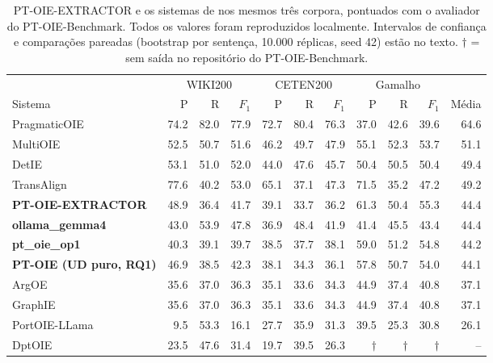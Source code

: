 \begin{table}[t]
\centering
\small
\setlength{\tabcolsep}{4pt}
\caption{PT-OIE-EXTRACTOR e os sistemas de \citet{silva2026benchmarking} nos mesmos tr\^es corpora, pontuados com o avaliador do PT-OIE-Benchmark. Todos os valores foram reproduzidos localmente. Intervalos de confian\c{c}a e compara\c{c}\~oes pareadas (bootstrap por senten\c{c}a, 10.000 r\'eplicas, seed 42) est\~ao no texto. $\dagger$ = sem sa\'ida no reposit\'orio do PT-OIE-Benchmark.}
\label{tab:external_benchmark}
\begin{tabular}{l rrr rrr rrr r}
\toprule
& \multicolumn{3}{c}{WIKI200} & \multicolumn{3}{c}{CETEN200} & \multicolumn{3}{c}{Gamalho} & \\
\cmidrule(lr){2-4}\cmidrule(lr){5-7}\cmidrule(lr){8-10}
Sistema & P & R & $F_1$ & P & R & $F_1$ & P & R & $F_1$ & M\'edia \\
\midrule
PragmaticOIE & 74.2 & 82.0 & 77.9 & 72.7 & 80.4 & 76.3 & 37.0 & 42.6 & 39.6 & 64.6 \\
MultiOIE & 52.5 & 50.7 & 51.6 & 46.2 & 49.7 & 47.9 & 55.1 & 52.3 & 53.7 & 51.1 \\
DetIE & 53.1 & 51.0 & 52.0 & 44.0 & 47.6 & 45.7 & 50.4 & 50.5 & 50.4 & 49.4 \\
TransAlign & 77.6 & 40.2 & 53.0 & 65.1 & 37.1 & 47.3 & 71.5 & 35.2 & 47.2 & 49.2 \\
\textbf{PT-OIE-EXTRACTOR} & 48.9 & 36.4 & 41.7 & 39.1 & 33.7 & 36.2 & 61.3 & 50.4 & 55.3 & 44.4 \\
\textbf{ollama_gemma4} & 43.0 & 53.9 & 47.8 & 36.9 & 48.4 & 41.9 & 41.4 & 45.5 & 43.4 & 44.4 \\
\textbf{pt_oie_op1} & 40.3 & 39.1 & 39.7 & 38.5 & 37.7 & 38.1 & 59.0 & 51.2 & 54.8 & 44.2 \\
\textbf{PT-OIE (UD puro, RQ1)} & 46.9 & 38.5 & 42.3 & 38.1 & 34.3 & 36.1 & 57.8 & 50.7 & 54.0 & 44.1 \\
ArgOE & 35.6 & 37.0 & 36.3 & 35.1 & 33.6 & 34.3 & 44.9 & 37.4 & 40.8 & 37.1 \\
GraphIE & 35.6 & 37.0 & 36.3 & 35.1 & 33.6 & 34.3 & 44.9 & 37.4 & 40.8 & 37.1 \\
PortOIE-LLama & 9.5 & 53.3 & 16.1 & 27.7 & 35.9 & 31.3 & 39.5 & 25.3 & 30.8 & 26.1 \\
DptOIE & 23.5 & 47.6 & 31.4 & 19.7 & 39.5 & 26.3 & $\dagger$ & $\dagger$ & $\dagger$ & -- \\
\bottomrule
\end{tabular}
\end{table}
